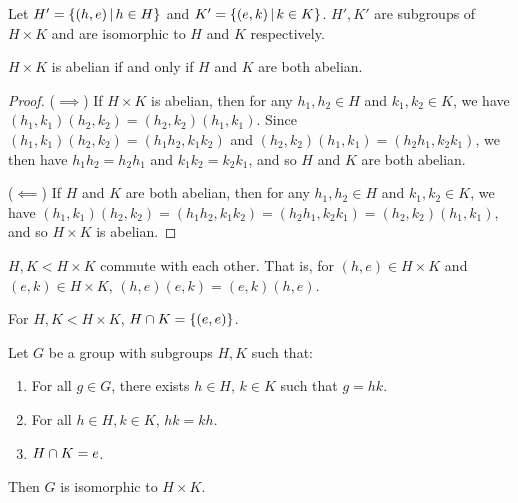 \begin{prop}
    Let $H' = \left\{(h, e) \,\middle|\, h \in H\right\}$ and $K' = \left\{(e, k) \,\middle|\, k \in K\right\}$. $H', K'$ are subgroups of $H \times K$ and are isomorphic to $H$ and $K$ respectively.
\end{prop}

\begin{prop}
    $H \times K$ is abelian if and only if $H$ and $K$ are both abelian.
\end{prop}

\begin{proof}\proofbreak
    ($\implies$) If $H \times K$ is abelian, then for any $h_1,h_2 \in H$ and $k_1,k_2 \in K$, we have $(h_1,k_1)(h_2,k_2) = (h_2,k_2)(h_1,k_1)$. Since $(h_1,k_1)(h_2,k_2) = (h_1h_2,k_1k_2)$ and $(h_2,k_2)(h_1,k_1) = (h_2h_1,k_2k_1)$, we then have $h_1h_2 = h_2h_1$ and $k_1k_2 = k_2k_1$, and so $H$ and $K$ are both abelian.

    ($\impliedby$) If $H$ and $K$ are both abelian, then for any $h_1,h_2 \in H$ and $k_1,k_2 \in K$, we have $(h_1,k_1)(h_2,k_2) = (h_1h_2,k_1k_2) = (h_2h_1,k_2k_1) = (h_2,k_2)(h_1,k_1)$, and so $H \times K$ is abelian.
\end{proof}

\begin{prop}
    $H, K < H \times K$ commute with each other. That is, for $(h, e) \in H \times K$ and $(e, k) \in H \times K$, $(h,e)(e, k) = (e, k)(h,e)$.
\end{prop}

\begin{prop}
    For $H, K < H \times K$, $H \cap K = \{(e, e)\}$.
\end{prop}

\begin{thm}\label{subgroups-product}
    Let $G$ be a group with subgroups $H,K$ such that:
    \begin{enumerate}[label=(\arabic*)]
        \item For all $g \in G$, there exists $h \in H$, $k \in K$ such that $g = hk$.
        \item For all $h \in H, k \in K$, $hk = kh$.
        \item $H \cap K = e$.
    \end{enumerate}
    Then $G$ is isomorphic to $H \times K$.
\end{thm}


